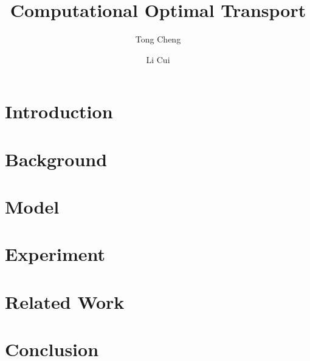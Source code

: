\documentclass[a4paper, 12pt]{article}
\title{Computational Optimal Transport}
\author{
    Tong Cheng \\ \bnu
    \and
    Li Cui \\ \bnu
}
\date{}
\begin{document}
\maketitle
\begin{abstract}
    \lipsum[1]
\end{abstract}

\section{Introduction}
    \lipsum[2]

\section{Background}
    \lipsum[3]

\section{Model}
    \lipsum[4]

\section{Experiment}
    \lipsum[5]

\section{Related Work}
\cite{peyre2020computational}
\cite{StaOfWD2019}


\section{Conclusion}
    \lipsum[7]



\end{document}
